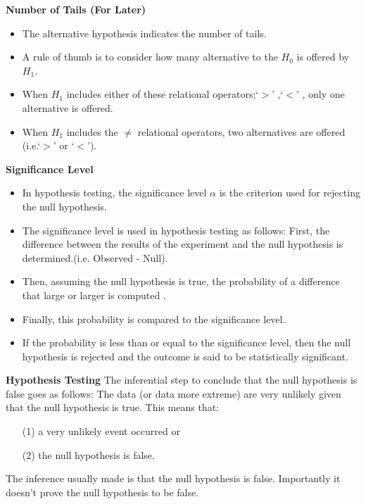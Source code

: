 {
\noindent \textbf{Number of Tails (For Later) }

\begin{itemize}
\item The alternative hypothesis indicates the number of tails.
\item A rule of thumb is to consider how many alternative to the $H_0$ is offered by $H_1$.
\item When $H_1$ includes either of these relational operators;`$>$' ,`$<$' , only one alternative is offered.
\item When $H_1$ includes the $\neq$ relational operators, two alternatives are offered (i.e.`$>$' or `$<$').
\end{itemize}
}



\noindent \textbf{Significance Level}

\begin{itemize}
\item In hypothesis testing, the significance level $\alpha$ is the criterion used for rejecting the null hypothesis. \item The significance level is used in hypothesis testing as follows: First, the difference between the results of the experiment and the null hypothesis is determined.(i.e. Observed - Null). \item Then, assuming the null hypothesis is true, the probability of a difference that large or larger is computed . \item Finally, this probability is compared to the significance level.\item  If the probability is less than or equal to the significance level, then the null hypothesis is rejected and the outcome is said to be statistically significant.
\end{itemize}



\noindent \textbf{Hypothesis Testing}
The inferential step to conclude that the null hypothesis is false goes as follows: The data (or data more extreme) are very unlikely given that the null hypothesis is true.
\bigskip
This means that:
\begin{itemize}
\item[(1)] a very unlikely event occurred or
\item[(2)] the null hypothesis is false.
\end{itemize}
\bigskip
The inference usually made is that the null hypothesis is false. Importantly it doesn't prove the null hypothesis to be false.

